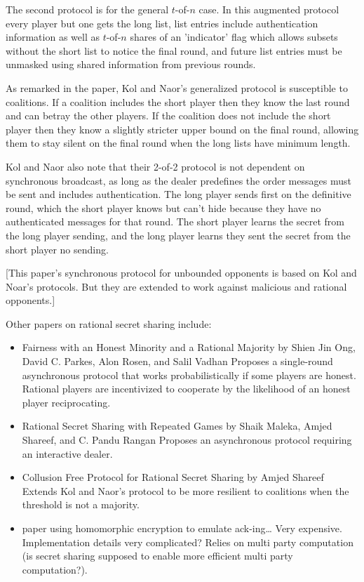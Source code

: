 \documentclass{dalcsthesis}
\begin{document}
The second protocol is for the general $t$-of-$n$ case. In this augmented protocol every player but one gets the long list, list entries include authentication information as well as $t$-of-$n$ shares of an 'indicator' flag which allows subsets without the short list to notice the final round, and future list entries must be unmasked using shared information from previous rounds.

As remarked in the paper, Kol and Naor's generalized protocol is susceptible to coalitions. If a coalition includes the short player then they know the last round and can betray the other players. If the coalition does not include the short player then they know a slightly stricter upper bound on the final round, allowing them to stay silent on the final round when the long lists have minimum length.

Kol and Naor also note that their 2-of-2 protocol is not dependent on synchronous broadcast, as long as the dealer predefines the order messages must be sent and includes authentication. The long player sends first on the definitive round, which the short player knows but can't hide because they have no authenticated messages for that round. The short player learns the secret from the long player sending, and the long player learns they sent the secret from the short player no sending.

[This paper's synchronous protocol for unbounded opponents is based on Kol and Noar's protocols. But they are extended to work against malicious and rational opponents.]

Other papers on rational secret sharing include:

\begin{itemize}
  \item Fairness with an Honest Minority and a Rational Majority by Shien Jin Ong, David  C. Parkes, Alon Rosen, and Salil Vadhan
    \subitem Proposes a single-round asynchronous protocol that works probabilistically if some players are honest. Rational players are incentivized to cooperate by the likelihood of an honest player reciprocating.
  \item Rational Secret Sharing with Repeated Games by Shaik Maleka, Amjed Shareef, and C. Pandu Rangan
    \subitem Proposes an asynchronous protocol requiring an interactive dealer.
  \item Collusion Free Protocol for Rational Secret Sharing by Amjed Shareef
    \subitem Extends Kol and Naor's protocol to be more resilient to coalitions when the threshold is not a majority.
  \item paper using homomorphic encryption to emulate ack-ing\ldots
    \subitem Very expensive. Implementation details very complicated? Relies on multi party computation (is secret sharing supposed to enable more efficient multi party computation?).
\end{itemize}
\end{document}
